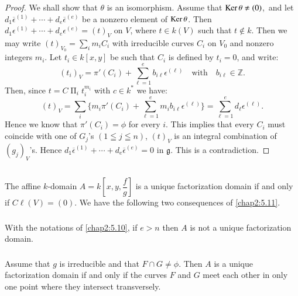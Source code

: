 \begin{proof}
We shall show that $\theta$ is an isomorphism. Assume that $\operatorname{Ker}
\theta \neq (0)$,\pageoriginale\ and let
$d_{1}\overline{\epsilon}^{(1)}+\cdots+d_{e}\overline{\epsilon}^{(e)}$
be a nonzero element of $\operatorname{Ker} \theta$. Then
$d_{1}\epsilon^{(1)}+\cdots+d_{e}\epsilon^{(e)}=(t)_{V}$ on $V$, where
$t\in k(V)$ such that $t\not\in k$. Then we may write
$(t)_{V_{0}}={\displaystyle{\mathop{\sum}_{i}}}m_{i}C_{i}$ with
irreducible curves $C_{i}$ on $V_{0}$ and nonzero integers
$m_{i}$. Let $t_{i}\in k[x,y]$ be such that $C_{i}$ is defined by
$t_{i}=0$, and write:
$$
(t_{i})_{V}=\pi'(C_{i})+\sum^{e}_{\ell=1}b_{i\ell}\epsilon^{(\ell)}\quad\text{with}\quad
b_{i\ell}\in \mathbb{Z}.
$$
Then, since $t=C{\displaystyle{\mathop{\Pi}_{i}}}t^{m_{i}}_{i}$ with
  $c\in k^{\ast}$ we have:
$$
(t)_{V}=\sum_{i}\{m_{i}\pi'(C_{i})+\sum^{e}_{\ell=1}m_{i}b_{i\ell}\epsilon^{(\ell)}\}=\sum^{e}_{\ell=1}d_{\ell}\epsilon^{(\ell)}.
$$
Hence we know that $\pi'(C_{i})=\phi$ for every $i$. This implies that
every $C_{i}$ must coincide with one of $G_{j}$'s $(1\leqq j\leqq n)$,
\iec $(t)_{V}$ is an integral combination of $(g_{j})_{V}$'s. Hence
$d_{1}\overline{\epsilon}^{(1)}+\cdots+d_{e}\overline{\epsilon}^{(e)}=0$
in $\mathfrak{g}$. This is a contradiction.
\end{proof}

\subsection{}\label{chap2:5.12}
The affine $k$-domain $A=k[x,y,\dfrac{f}{g}]$ is a unique
factorization domain if and only if $C\ell(V)=(0)$. We have the
following two consequences of \ref{chap2:5.11}.

\subsubsection{}\label{chap2:5.12.1}
\begin{coro*}
  With the notations of \ref{chap2:5.10}, if $e>n$ then $A$ is not a unique
  factorization domain.
\end{coro*}

\subsubsection{}\label{chap2:5.12.2}
\begin{coro*}
  Assume that $g$ is irreducible and that $F\cap G\neq \phi$. Then $A$
  is a unique factorization domain if and only if the curves $F$ and $G$
  meet each other in only one point where they intersect transversely.
\end{coro*}

